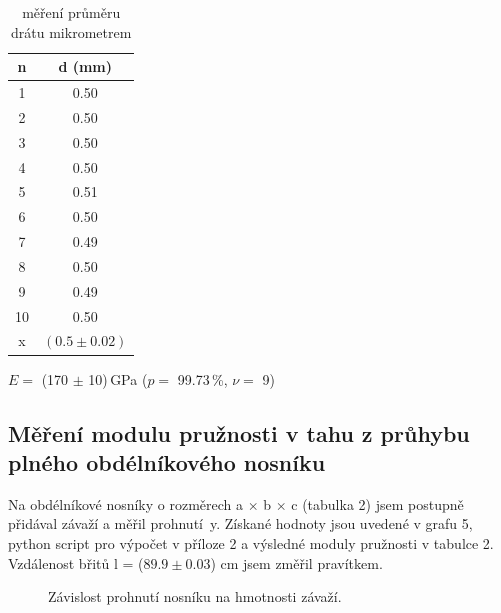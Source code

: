 \documentclass[a4paper,11pt]{article}
\newcommand{\vrn}[6]{\ensuremath{#1 =} (#2 $\pm$ #3)\,#4 ($p=$ #5\,\%, $\nu=$ #6)}
\begin{document}
\begin{table}[htpb]
  \begin{minipage}{0.62\linewidth}
    \centering
    
  \end{minipage}
  \hfill
  \begin{minipage}{0.30\linewidth}
    \centering
    \begin{tabular}{|c|c|}
      \hline
      n & d (mm) \\
      \hline
      1 & 0.50 \\
      2 & 0.50 \\
      3 & 0.50 \\
      4 & 0.50 \\
      5 & 0.51 \\
      6 & 0.50 \\
      7 & 0.49 \\
      8 & 0.50 \\
      9 & 0.49 \\
      10 & 0.50 \\
      \hline
      x & $(0.5 \pm 0.02)$ \\
      \hline
    \end{tabular}
    \caption{měření průměru drátu mikrometrem}
  \end{minipage}
\end{table}
\vspace{-10pt}
\begin{center}
 \vrn{E}{170}{10}{GPa}{99.73}{9} 
\end{center}

\subsection{Měření modulu pružnosti v tahu z průhybu plného obdélníkového nosníku}

Na obdélníkové nosníky o rozměrech a $\times$ b $\times$ c (tabulka 2) jsem postupně přidával závaží a měřil prohnutí~y. Získané hodnoty jsou uvedené v grafu 5, python script pro výpočet v příloze 2 a výsledné moduly pružnosti v tabulce 2. Vzdálenost břitů l = ($89.9\pm0.03$) cm jsem změřil pravítkem.

\begin{figure}[htpb]
  \centering
  
  \caption{Závislost prohnutí nosníku na hmotnosti závaží.}
\end{figure}
\end{document}
